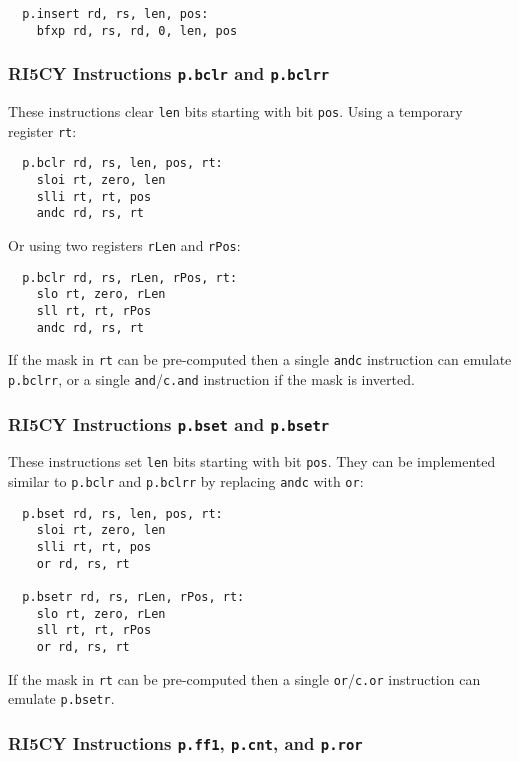 \begin{verbatim}
  p.insert rd, rs, len, pos:
    bfxp rd, rs, rd, 0, len, pos
\end{verbatim}

\subsubsection{RI5CY Instructions {\tt p.bclr} and {\tt p.bclrr}}

These instructions clear {\tt len} bits starting with bit {\tt pos}. Using a
temporary register {\tt rt}:

\begin{verbatim}
  p.bclr rd, rs, len, pos, rt:
    sloi rt, zero, len
    slli rt, rt, pos
    andc rd, rs, rt
\end{verbatim}

Or using two registers {\tt rLen} and {\tt rPos}:

\begin{verbatim}
  p.bclr rd, rs, rLen, rPos, rt:
    slo rt, zero, rLen
    sll rt, rt, rPos
    andc rd, rs, rt
\end{verbatim}

If the mask in {\tt rt} can be pre-computed then a single {\tt andc} instruction
can emulate {\tt p.bclrr}, or a single {\tt and}/{\tt c.and} instruction if the
mask is inverted.

\subsubsection{RI5CY Instructions {\tt p.bset} and {\tt p.bsetr}}

These instructions set {\tt len} bits starting with bit {\tt pos}. They can be
implemented similar to {\tt p.bclr} and {\tt p.bclrr} by replacing {\tt andc}
with {\tt or}:

\begin{verbatim}
  p.bset rd, rs, len, pos, rt:
    sloi rt, zero, len
    slli rt, rt, pos
    or rd, rs, rt

  p.bsetr rd, rs, rLen, rPos, rt:
    slo rt, zero, rLen
    sll rt, rt, rPos
    or rd, rs, rt
\end{verbatim}

If the mask in {\tt rt} can be pre-computed then a single {\tt or}/{\tt c.or} instruction
can emulate {\tt p.bsetr}.

\subsubsection{RI5CY Instructions {\tt p.ff1}, {\tt p.cnt}, and {\tt p.ror}}

